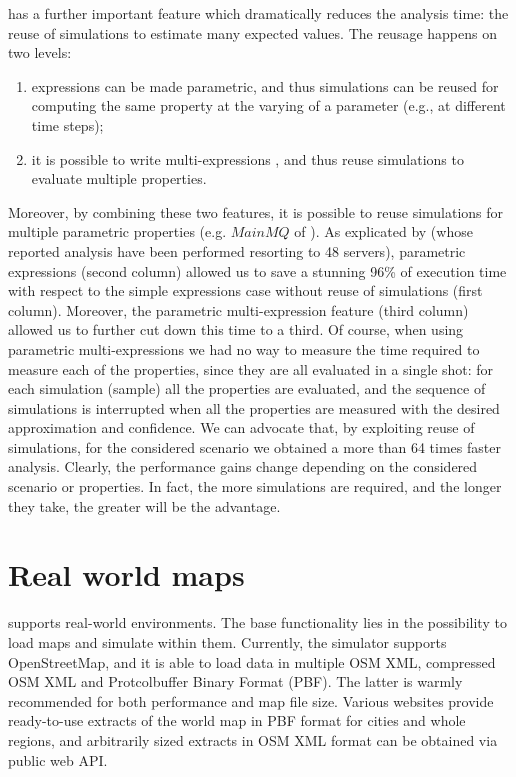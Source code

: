 \documentclass[12pt,a4paper,twoside,openright]{book}
\begin{document}
\multivesta{} has a further important feature which dramatically reduces the analysis time: the reuse of simulations to estimate many expected values. 
%
The reusage happens on two levels:
\begin{enumerate}
 \item expressions can be made parametric, and thus simulations can be reused for computing the same property at the varying of a parameter (e.g., at different time steps);
 \item it is possible to write multi-expressions , and thus reuse simulations to evaluate multiple properties.
\end{enumerate}
%
Moreover,  by combining these two features, it is possible to reuse simulations for multiple parametric properties (e.g. $MainMQ$ of ).
%
As explicated by  (whose reported analysis have been performed resorting to 48 servers), parametric expressions (second column) allowed us to save a stunning 96\% of execution time with respect to the simple expressions case without reuse of simulations (first column).
%
Moreover, the parametric multi-expression feature (third column) allowed us to further cut down this time to a third.
%
Of course, when using parametric multi-expressions we had no way to measure the time required to measure each of the properties, since they are all evaluated in a single shot: for each simulation (sample) all the properties are evaluated, and the sequence of simulations is interrupted when all the properties are measured with the desired approximation and confidence.
%
We can advocate that, by exploiting reuse of simulations, for the considered scenario we obtained a more than 64 times faster analysis.
%
Clearly, the performance gains change depending on the considered scenario or properties. In fact, the more simulations are required, and the longer they take, the greater will be the advantage.

\section{Real world maps}
\label{real-world-maps}
\alchemist{} supports real-world environments.
%
The base functionality lies in the possibility to load maps and simulate within them.
%
Currently, the simulator supports OpenStreetMap\cite{osm}, and it is able to load data in multiple OSM XML, compressed OSM XML and Protcolbuffer Binary Format (PBF).
%
The latter is warmly recommended for both performance and map file size.
%
Various websites provide ready-to-use extracts of the world map in PBF format for cities and whole regions, and arbitrarily sized extracts in OSM XML format can be obtained via public web API.
\end{document}
